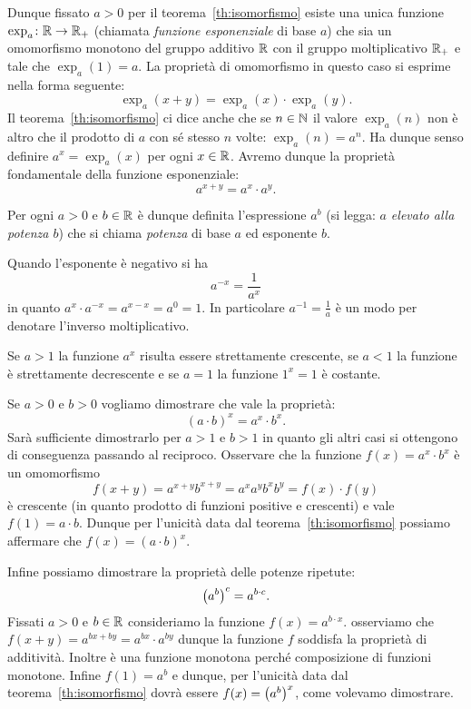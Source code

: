 Dunque fissato $a>0$ per il teorema~\ref{th:isomorfismo}
esiste una unica funzione $\exp_a\colon {\mathbb R} \to {\mathbb R}_+$ 
(chiamata \emph{funzione esponenziale}%
%
%
%
di base $a$)
che sia un omomorfismo monotono del gruppo additivo ${\mathbb R}$ con il gruppo
moltiplicativo ${\mathbb R}_+$ e tale che $\exp_a(1)=a$.
La proprietà di omomorfismo in questo caso 
si esprime nella forma seguente: 
\begin{equation}\label{eq:3589673}
  \exp_a(x+y) = \exp_a(x)\cdot \exp_a(y).
\end{equation}
Il teorema~\ref{th:isomorfismo}
ci dice anche che se $n\in {\mathbb N}$ il valore $\exp_a(n)$ 
non è altro che il prodotto di $a$ 
con sé stesso $n$ volte: $\exp_a(n) = a^n$. 
Ha dunque senso definire 
$a^x = \exp_a(x)$ per ogni $x\in {\mathbb R}$.
Avremo dunque la proprietà fondamentale della funzione 
esponenziale:
\[
  a^{x+y} = a^x\cdot a^y.
\]

Per ogni $a>0$ e $b\in {\mathbb R}$ è dunque definita l'espressione $a^b$
(si legga: \emph{$a$ elevato alla potenza $b$}) che si chiama 
\emph{potenza}%
%
%
di base $a$ ed esponente $b$.

Quando l'esponente è negativo si ha 
\[
  a^{-x} = \frac{1}{a^x}  
\]
in quanto $a^x\cdot a^{-x} = a^{x-x} = a^0 = 1$.
In particolare $a^{-1} = \frac{1}{a}$ è un modo per denotare  
l'inverso moltiplicativo.

Se $a>1$ 
la funzione $a^x$ risulta essere strettamente crescente, 
se $a<1$ la funzione è strettamente decrescente 
e se $a=1$ la funzione $1^x=1$ è costante.

Se $a>0$ e $b>0$ vogliamo dimostrare che vale la proprietà:
\[
  (a\cdot b)^x = a^x\cdot b^x.
\]
Sarà sufficiente dimostrarlo per $a>1$ e $b>1$ in quanto gli 
altri casi si ottengono di conseguenza passando al reciproco.
Osservare che la funzione $f(x)=a^x\cdot b^x$ 
è un omomorfismo
\[
f(x+y) = a^{x+y}b^{x+y} = a^x a^y b^x b^y =  f(x)\cdot f(y)
\]
è crescente (in quanto prodotto di funzioni positive e crescenti)
e vale $f(1) = a\cdot b$. 
Dunque per l'unicità data dal teorema~\ref{th:isomorfismo}
possiamo affermare che $f(x)=(a\cdot b)^x$.

Infine possiamo dimostrare la proprietà delle potenze ripetute:
\[
  {\left( a^b \right)}^c = a^{b\cdot c}.
\]
Fissati $a>0$ e $b\in {\mathbb R}$ consideriamo la funzione $f(x) = a^{b\cdot x}$.
osserviamo che $f(x+y) = a^{bx+by}=a^{bx}\cdot a^{by}$ dunque 
la funzione $f$ soddisfa la proprietà di additività. 
Inoltre è una funzione monotona perché composizione di funzioni monotone.
Infine $f(1) = a^b$ e dunque, per l'unicità data dal teorema~\ref{th:isomorfismo}
dovrà essere $f(x) = {\left( a^b \right)}^x$, come volevamo dimostrare. 

